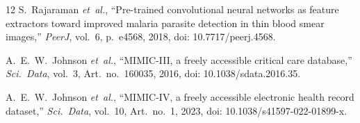 \documentclass[conference]{IEEEtran}
\begin{document}
\begin{thebibliography}{12}
S.~Rajaraman \textit{et~al.}, ``Pre-trained convolutional neural networks as feature extractors toward improved malaria parasite detection in thin blood smear images,'' \textit{PeerJ}, vol.~6, p.~e4568, 2018, doi: 10.7717/peerj.4568.

A.~E.~W.~Johnson \textit{et~al.}, ``MIMIC-III, a freely accessible critical care database,'' \textit{Sci.\ Data}, vol.~3, Art.~no.~160035, 2016, doi: 10.1038/sdata.2016.35.

A.~E.~W.~Johnson \textit{et~al.}, ``MIMIC-IV, a freely accessible electronic health record dataset,'' \textit{Sci.\ Data}, vol.~10, Art.~no.~1, 2023, doi: 10.1038/s41597-022-01899-x.

\end{thebibliography}
\end{document}
